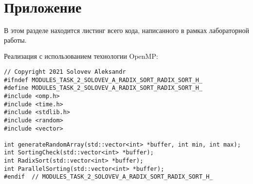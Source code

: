 \documentclass{report}
\begin{document}
\section*{Приложение}
В этом разделе находится листинг всего кода, написанного в рамках лабораторной работы.
\par Реализация с использованием технологии OpenMP:
\begin{lstlisting}
// Copyright 2021 Solovev Aleksandr
#ifndef MODULES_TASK_2_SOLOVEV_A_RADIX_SORT_RADIX_SORT_H_
#define MODULES_TASK_2_SOLOVEV_A_RADIX_SORT_RADIX_SORT_H_
#include <omp.h>
#include <time.h>
#include <stdlib.h>
#include <random>
#include <vector>

int generateRandomArray(std::vector<int> *buffer, int min, int max);
int SortingCheck(std::vector<int> *buffer);
int RadixSort(std::vector<int> *buffer);
int ParallelSorting(std::vector<int> *buffer);
#endif  // MODULES_TASK_2_SOLOVEV_A_RADIX_SORT_RADIX_SORT_H_
\end{lstlisting}
\end{document}
